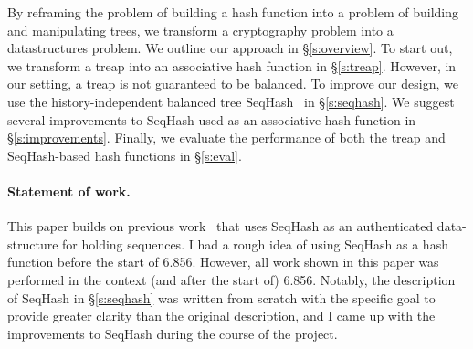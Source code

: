 By reframing the problem of building a hash function into a problem of building
and manipulating trees, we transform a cryptography problem into a
datastructures problem. We outline our approach in \S\ref{s:overview}.  To
start out, we transform a treap into an associative hash function in
\S\ref{s:treap}. However, in our setting, a treap is not guaranteed to be
balanced. To improve our design, we use the history-independent balanced tree
SeqHash~\cite{versum:ccs14} in \S\ref{s:seqhash}. We suggest several
improvements to SeqHash used as an associative hash function in
\S\ref{s:improvements}. Finally, we evaluate the performance of both the treap
and SeqHash-based hash functions in \S\ref{s:eval}.

\paragraph{Statement of work.} This paper builds on previous work~\cite{versum:ccs14} that uses SeqHash as an
authenticated data-structure for holding sequences. I had a rough idea of using
SeqHash as a hash function before the start of 6.856. However, all work shown
in this paper was performed in the context (and after the start of) 6.856.
Notably, the description of SeqHash in \S\ref{s:seqhash} was written from
scratch with the specific goal to provide greater clarity than the original
description, and I came up with the improvements to SeqHash during the course
of the project.

